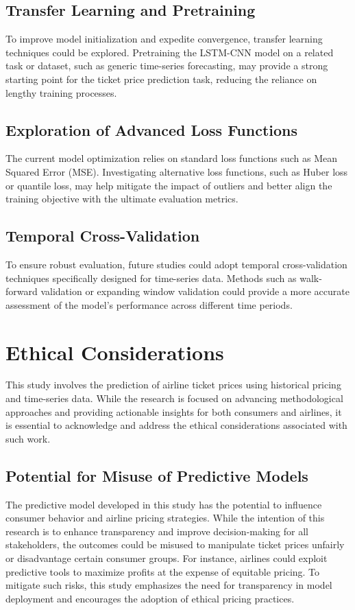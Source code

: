 \documentclass[conference]{IEEEtran}
\begin{document}
\subsection{Transfer Learning and Pretraining}
To improve model initialization and expedite convergence, transfer learning techniques could be explored. Pretraining the LSTM-CNN model on a related task or dataset, such as generic time-series forecasting, may provide a strong starting point for the ticket price prediction task, reducing the reliance on lengthy training processes.

\subsection{Exploration of Advanced Loss Functions}
The current model optimization relies on standard loss functions such as Mean Squared Error (MSE). Investigating alternative loss functions, such as Huber loss or quantile loss, may help mitigate the impact of outliers and better align the training objective with the ultimate evaluation metrics.

\subsection{Temporal Cross-Validation}
To ensure robust evaluation, future studies could adopt temporal cross-validation techniques specifically designed for time-series data. Methods such as walk-forward validation or expanding window validation could provide a more accurate assessment of the model’s performance across different time periods.


\section{Ethical Considerations}
This study involves the prediction of airline ticket prices using historical pricing and time-series data. While the research is focused on advancing methodological approaches and providing actionable insights for both consumers and airlines, it is essential to acknowledge and address the ethical considerations associated with such work.
\subsection{Potential for Misuse of Predictive Models}
The predictive model developed in this study has the potential to influence consumer behavior and airline pricing strategies. While the intention of this research is to enhance transparency and improve decision-making for all stakeholders, the outcomes could be misused to manipulate ticket prices unfairly or disadvantage certain consumer groups. For instance, airlines could exploit predictive tools to maximize profits at the expense of equitable pricing. To mitigate such risks, this study emphasizes the need for transparency in model deployment and encourages the adoption of ethical pricing practices.
\end{document}

